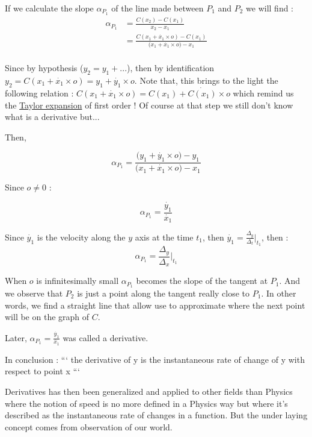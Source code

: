 \documentclass[12pt]{article}
\begin{document}
If we calculate the slope $\alpha_{P_1}$ of the line made between $P_1$ and $P_2$ we will find :
\begin{equation*}
    \begin{split}
        \alpha_{P_1} &= \frac{C(x_2)-C(x_1)}{x_2-x_1} \\
                    &= \frac{ C(x_1 + \dot{x_1} \times o) -C(x_1)}{\big( x_1 + \dot{x_1} \times o \big) -x_1} \\
    \end{split}
\end{equation*}

Since by hypothesis ($y_2 = y_1 + ...$), then by identification $y_2=C(x_1 + \dot{x_1} \times o)=y_1 + \dot{y_1} \times o$. Note that, this brings to the light the following relation : $C(x_1 + \dot{x_1} \times o) = C(x_1) + \dot{C(x_1)} \times o$ which remind us the \href{https://en.wikipedia.org/wiki/Taylor_series}{Taylor expansion} of first order ! Of course at that step we still don't know what is a derivative but...

Then, 

\begin{equation*}
\alpha_{P_1} = \frac{ \big( y_1 + \dot{y_1} \times o \big) - y_1}{\big( x_1 + \dot{x_1} \times o \big) -x_1}
\end{equation*}

Since $o \neq 0$ : 

$$
\alpha_{P_1} = \frac{\dot{y_1}}{\dot{x_1}}
$$

Since $\dot{y_1}$ is the velocity along the $y$ axis at the time $t_1$, then $\dot{y_1} = \frac{\Delta_y}{\Delta_t}|_{t_1}$, then :
$$
\alpha_{P_1} = \frac{\Delta_y}{\Delta_x} \big|_{t_1}
$$

When $o$ is infinitesimally small $\alpha_{P_1}$ becomes the slope of the tangent at $P_1$. And we observe that $P_2$ is just a point along the tangent really close to $P_1$. In other words, we find a straight line that allow use to approximate where the next point will be on the graph of $C$.

Later, $\alpha_{P_1} = \frac{\dot{y_1}}{\dot{x_1}}$ was called a derivative.

In conclusion :
```
the derivative of y is the instantaneous rate of change of y with respect to point x
```

Derivatives has then been generalized and applied to other fields than Physics where the notion of speed is no more defined in a Physics way but where it's described as the instantaneous rate of changes in a function. But the under laying concept comes from observation of our world.
\end{document}
